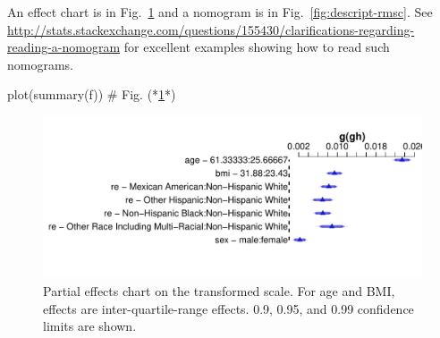An effect chart is in Fig.~\ref{fig:descript-rmsb} and a nomogram is
in Fig.~\ref{fig:descript-rmsc}.  See
\url{http://stats.stackexchange.com/questions/155430/clarifications-regarding-reading-a-nomogram}
for excellent examples showing how to read such nomograms.
\begin{Schunk}
\begin{Sinput}
plot(summary(f))   # Fig. (*\ref{fig:descript-rmsb}*)
\end{Sinput}
\begin{figure}[htbp]

\centerline{\includegraphics[width=\maxwidth]{descript-rmsb-1} }

\caption[Partial effects chart for transformed glycohemoglobin]{Partial effects chart on the transformed scale.  For age and BMI, effects are inter-quartile-range effects.  0.9, 0.95, and 0.99 confidence limits are shown.}\label{fig:descript-rmsb}
\end{figure}
\end{Schunk}
